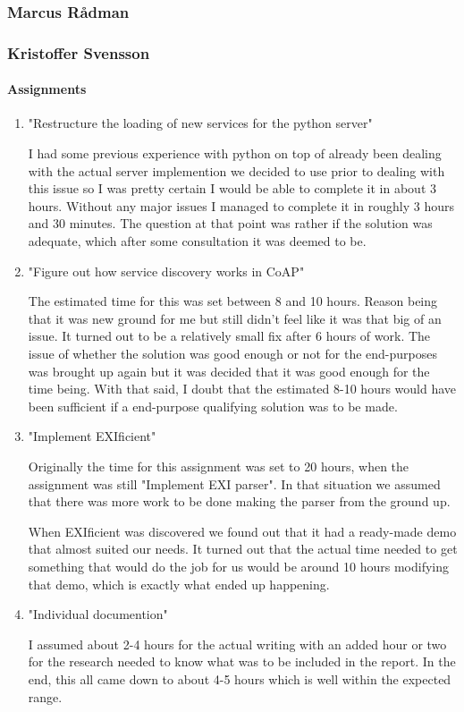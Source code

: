 \subsubsection{Marcus Rådman}
\subsubsection{Kristoffer Svensson}
\paragraph{Assignments}
\begin{enumerate}
\item{"Restructure the loading of new services for the python server"}

I had some previous experience with python on top of already been dealing with the actual server implemention we decided to use prior to dealing with this issue so I was pretty certain I would be able to complete it in about 3 hours.
Without any major issues I managed to complete it in roughly 3 hours and 30 minutes. The question at that point was rather if the solution was adequate, which after some consultation it was deemed to be.

\item {"Figure out how service discovery works in CoAP"}

The estimated time for this was set between 8 and 10 hours. Reason being that it was new ground for me but still didn't feel like it was that big of
an issue. It turned out to be a relatively small fix after 6 hours of work. The issue of whether the solution was good enough or not for the end-purposes was brought up again but it was decided that it was good enough for the time being.
With that said, I doubt that the estimated 8-10 hours would have been sufficient if a end-purpose qualifying solution was to be made. 

\item {"Implement EXIficient"}

Originally the time for this assignment was set to 20 hours, when the assignment was still "Implement EXI parser". In that situation we assumed that there was more work to be done making the parser from the ground up.

When EXIficient was discovered we found out that it had a ready-made demo that almost suited our needs. It turned out that the actual time needed to get something that would do the job for us would be around 10 hours modifying that demo, which is exactly what ended up happening.

\item {"Individual documention"}

I assumed about 2-4 hours for the actual writing with an added hour or two for the research needed to know what was to be included in the report. In the end, this all came down to about 4-5 hours which is well within the expected range.

\end{enumerate}

